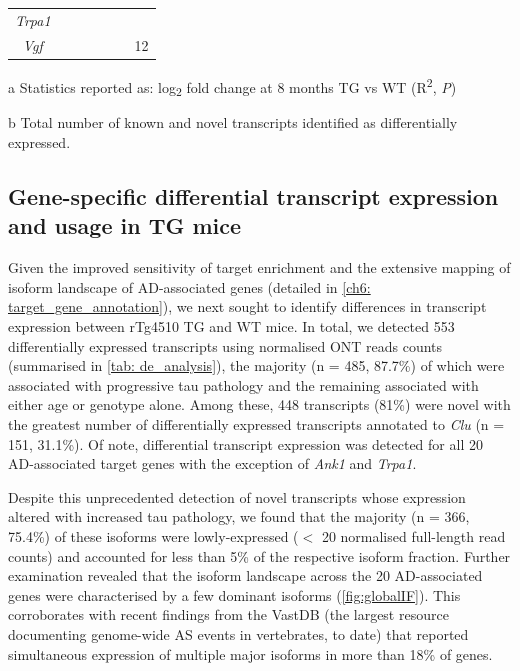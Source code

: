 \begin{landscape}
\begin{table}[]
\begin{threeparttable}
\begin{tabular}{@{}ccccccc@{}}
				\textit{Trpa1} &
				\cellcolor[HTML]{EFEFEF} &
				\cellcolor[HTML]{EFEFEF} &
				\cellcolor[HTML]{EFEFEF} &
				\cellcolor[HTML]{EFEFEF} &
				\cellcolor[HTML]{EFEFEF} &
				\cellcolor[HTML]{EFEFEF} \\
				\textit{Vgf} &
				\cellcolor[HTML]{EFEFEF} &
				\cellcolor[HTML]{EFEFEF} &
				\cellcolor[HTML]{EFEFEF} &
				\cellcolor[HTML]{EFEFEF} &
				\cellcolor[HTML]{EFEFEF} &
				12 \\ \bottomrule
			\end{tabular}
			\begin{tablenotes}
				\footnotesize
				\item[a] Statistics reported as: log\textsubscript{2} fold change at 8 months TG vs WT (R\textsuperscript{2}, \textit{P})
				\item[b] Total number of known and novel transcripts identified as differentially expressed. 
			\end{tablenotes}
		\end{threeparttable}
	\end{table}
\end{landscape}
\restoregeometry

\newpage
\subsection{Gene-specific differential transcript expression and usage in TG mice}
Given the improved sensitivity of target enrichment and the extensive mapping of isoform landscape of AD-associated genes (detailed in \cref{ch6: target_gene_annotation}), we next sought to identify differences in transcript expression between rTg4510 TG and WT mice. In total, we detected 553 differentially expressed transcripts using normalised ONT reads counts (summarised in \cref{tab: de_analysis}), the majority (n = 485, 87.7\%) of which were associated with progressive tau pathology and the remaining associated with either age or genotype alone. Among these, 448 transcripts (81\%) were novel with the greatest number of differentially expressed transcripts annotated to \textit{Clu} (n = 151, 31.1\%). Of note, differential transcript expression was detected for all 20 AD-associated target genes with the exception of \textit{Ank1} and \textit{Trpa1}. 

Despite this unprecedented detection of novel transcripts whose expression altered with increased tau pathology, we found that the majority (n = 366, 75.4\%) of these isoforms were lowly-expressed ($<$ 20 normalised full-length read counts) and accounted for less than 5\% of the respective isoform fraction. Further examination revealed that the isoform landscape across the 20 AD-associated genes were characterised by a few dominant isoforms (\cref{fig:globalIF}). This corroborates with recent findings from the VastDB\cite{Tapial2017} (the largest resource documenting genome-wide AS events in vertebrates, to date) that reported simultaneous expression of multiple major isoforms in more than 18\% of genes\cite{Tapial2017}. 


